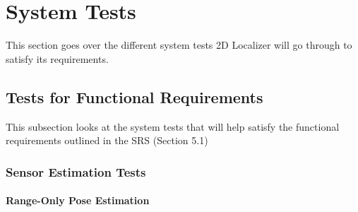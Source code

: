 \documentclass[12pt, titlepage]{article}
\begin{document}



\section{System Tests}\label{sec_sys-tests}

This section goes over the different system tests 2D Localizer will go through to satisfy its requirements.


\subsection{Tests for Functional Requirements}



This subsection looks at the system tests that will help satisfy the functional requirements outlined in the SRS (Section 5.1)

\subsubsection{Sensor Estimation Tests}


		
\paragraph{Range-Only Pose Estimation}
\end{document}
